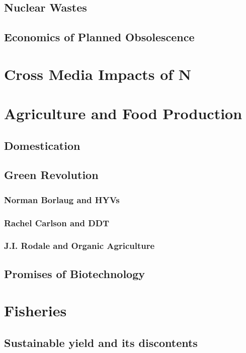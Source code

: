 \documentclass{tufte-book}\usepackage[]{graphicx}\usepackage[]{xcolor}
\begin{document}
\section{Nuclear Wastes}


\section{Economics of Planned Obsolescence}


\chapter{Cross Media Impacts of N}

\chapter{Agriculture and Food Production}

\section{Domestication}

\section{Green Revolution}

\subsection{Norman Borlaug and HYVs}

\subsection{Rachel Carlson and DDT}

\subsection{J.I. Rodale and Organic Agriculture}

\section{Promises of Biotechnology}


\chapter{Fisheries}

\section{Sustainable yield and its discontents}
\end{document}
